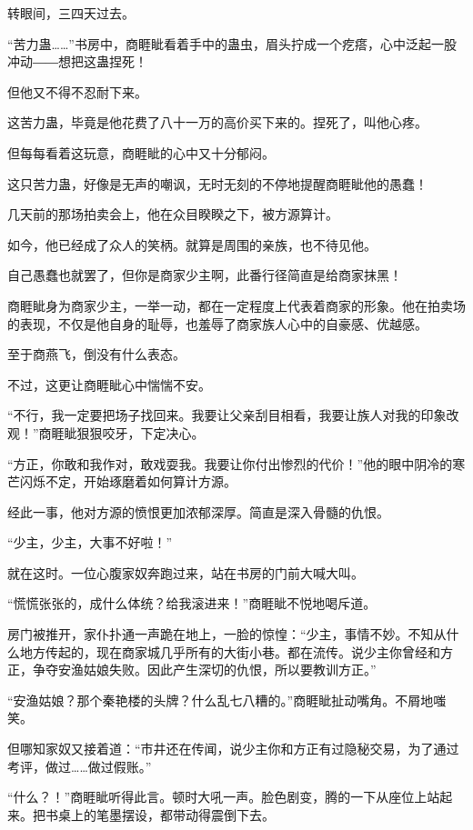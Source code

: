 
\begin{this_body}

转眼间，三四天过去。

“苦力蛊……”书房中，商睚眦看着手中的蛊虫，眉头拧成一个疙瘩，心中泛起一股冲动――想把这蛊捏死！

但他又不得不忍耐下来。

这苦力蛊，毕竟是他花费了八十一万的高价买下来的。捏死了，叫他心疼。

但每每看着这玩意，商睚眦的心中又十分郁闷。

这只苦力蛊，好像是无声的嘲讽，无时无刻的不停地提醒商睚眦他的愚蠢！

几天前的那场拍卖会上，他在众目睽睽之下，被方源算计。

如今，他已经成了众人的笑柄。就算是周围的亲族，也不待见他。

自己愚蠢也就罢了，但你是商家少主啊，此番行径简直是给商家抹黑！

商睚眦身为商家少主，一举一动，都在一定程度上代表着商家的形象。他在拍卖场的表现，不仅是他自身的耻辱，也羞辱了商家族人心中的自豪感、优越感。

至于商燕飞，倒没有什么表态。

不过，这更让商睚眦心中惴惴不安。

“不行，我一定要把场子找回来。我要让父亲刮目相看，我要让族人对我的印象改观！”商睚眦狠狠咬牙，下定决心。

“方正，你敢和我作对，敢戏耍我。我要让你付出惨烈的代价！”他的眼中阴冷的寒芒闪烁不定，开始琢磨着如何算计方源。

经此一事，他对方源的愤恨更加浓郁深厚。简直是深入骨髓的仇恨。

“少主，少主，大事不好啦！”

就在这时。一位心腹家奴奔跑过来，站在书房的门前大喊大叫。

“慌慌张张的，成什么体统？给我滚进来！”商睚眦不悦地喝斥道。

房门被推开，家仆扑通一声跪在地上，一脸的惊惶：“少主，事情不妙。不知从什么地方传起的，现在商家城几乎所有的大街小巷。都在流传。说少主你曾经和方正，争夺安渔姑娘失败。因此产生深切的仇恨，所以要教训方正。”

“安渔姑娘？那个秦艳楼的头牌？什么乱七八糟的。”商睚眦扯动嘴角。不屑地嗤笑。

但哪知家奴又接着道：“市井还在传闻，说少主你和方正有过隐秘交易，为了通过考评，做过……做过假账。”

“什么？！”商睚眦听得此言。顿时大吼一声。脸色剧变，腾的一下从座位上站起来。把书桌上的笔墨摆设，都带动得震倒下去。


\end{this_body}
